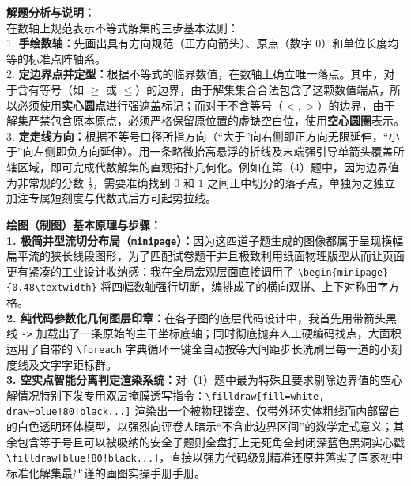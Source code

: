 {\small\color{gray}
\textbf{解题分析与说明：}\\
在数轴上规范表示不等式解集的三步基本法则：\\
1. \textbf{手绘数轴：}先画出具有方向规范（正方向箭头）、原点（数字 $0$）和单位长度均等的标准点阵轴系。\\
2. \textbf{定边界点并定型：}根据不等式的临界数值，在数轴上确立唯一落点。其中，对于含有等号（如 $\geqslant$ 或 $\leqslant$）的边界，由于解集集合合法包含了这颗数值端点，所以必须使用\textbf{实心圆点}进行强遮盖标记；而对于不含等号（$<, >$）的边界，由于解集严禁包含原本原点，必须严格保留原位置的虚缺空白位，使用\textbf{空心圆圈}表示。\\
3. \textbf{定走线方向：}根据不等号口径所指方向（“大于”向右侧即正方向无限延伸，“小于”向左侧即负方向延伸）。用一条略微抬高悬浮的折线及末端强引导单箭头覆盖所辖区域，即可完成代数解集的直观拓扑几何化。例如在第（4）题中，因为边界值为非常规的分数 $\frac{1}{2}$，需要准确找到 $0$ 和 $1$ 之间正中切分的落子点，单独为之独立加注专属短刻度与代数式后方可起势拉线。
}

\vspace{0.6cm}

{\small\color{blue!70!black}
\textbf{绘图（制图）基本原理与步骤：}\\
\textbf{1. 极简并型流切分布局（\texttt{minipage}）：}因为这四道子题生成的图像都属于呈现横幅扁平流的狭长线段图形，为了匹配试卷题干并且极致利用纸面物理版型从而让页面更有紧凑的工业设计收纳感：我在全局宏观层面直接调用了 \texttt{\textbackslash begin\{minipage\}\{0.48\textbackslash textwidth\}} 将四幅数轴强行切断，编排成了的横向双拼、上下对称田字方格。\\
\textbf{2. 纯代码参数化几何图层印章：}在各子图的底层代码设计中，我首先用带箭头黑线 \texttt{->} 加载出了一条原始的主干坐标底轴；同时彻底抛弃人工硬编码找点，大面积运用了自带的 \texttt{\textbackslash foreach} 字典循环一键全自动按等大间距步长洗刷出每一道的小刻度线及文字字距标群。\\
\textbf{3. 空实点智能分离判定渲染系统：}对（1）题中最为特殊且要求剔除边界值的空心解情况特别下发专用双层掩膜透写指令：\texttt{\textbackslash filldraw[fill=white, draw=blue!80!black...]} 渲染出一个被物理镂空、仅带外环实体粗线而内部留白的白色透明环体模型，以强烈向评卷人暗示“不含此边界区间”的数学定式意义；其余包含等于号且可以被吸纳的安全子题则全盘打上无死角全封闭深蓝色黑洞实心戳 \texttt{\textbackslash filldraw[blue!80!black...]}，直接以强力代码级别精准还原并落实了国家初中标准化解集最严谨的画图实操手册手册。
}

\newpage



